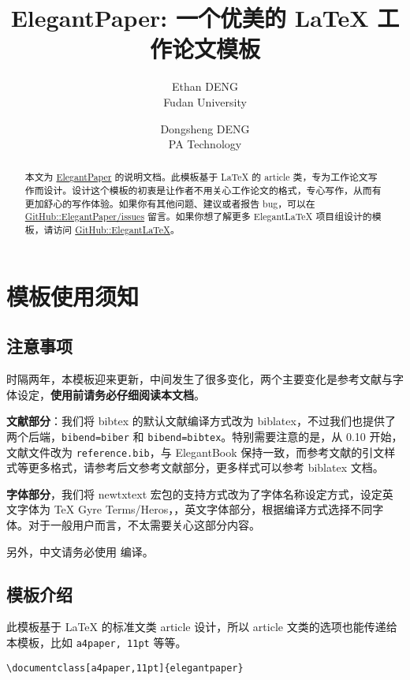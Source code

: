 \documentclass[lang=cn,11pt,a4paper]{elegantpaper}
\title{ElegantPaper: 一个优美的 \LaTeX{} 工作论文模板}
\author{Ethan DENG \\ Fudan University \and Dongsheng DENG \\ PA Technology}
\institute{\href{https://elegantlatex.org/}{Elegant\LaTeX{} 项目组}}
\date{\zhtoday}
\begin{document}
\maketitle

\begin{abstract}
本文为 \href{https://github.com/ElegantLaTeX/ElegantPaper/}{ElegantPaper} 的说明文档。此模板基于 \LaTeX{} 的 article 类，专为工作论文写作而设计。设计这个模板的初衷是让作者不用关心工作论文的格式，专心写作，从而有更加舒心的写作体验。如果你有其他问题、建议或者报告 bug，可以在 \href{https://github.com/ElegantLaTeX/ElegantPaper/issues}{GitHub::ElegantPaper/issues} 留言。如果你想了解更多 Elegant\LaTeX{} 项目组设计的模板，请访问 \href{https://github.com/ElegantLaTeX/}{GitHub::ElegantLaTeX}。
\end{abstract}


\section{模板使用须知}

\subsection{注意事项}

时隔两年，本模板迎来更新，中间发生了很多变化，两个主要变化是参考文献与字体设定，\textbf{使用前请务必仔细阅读本文档}。

\textbf{文献部分}：我们将 bibtex 的默认文献编译方式改为 biblatex，不过我们也提供了两个后端，\lstinline{bibend=biber} 和 \lstinline{bibend=bibtex}。特别需要注意的是，从 0.10 开始，文献文件改为 \lstinline{reference.bib}，与 ElegantBook 保持一致，而参考文献的引文样式等更多格式，请参考后文参考文献部分，更多样式可以参考 biblatex 文档。 

\textbf{字体部分}，我们将 newtxtext 宏包的支持方式改为了字体名称设定方式，设定英文字体为 TeX Gyre Terms/Heros，，英文字体部分，根据编译方式选择不同字体。对于一般用户而言，不太需要关心这部分内容。

另外，中文请务必使用  编译。

\subsection{模板介绍}

此模板基于 \LaTeX{} 的标准文类 article 设计，所以 article 文类的选项也能传递给本模板，比如 \lstinline{a4paper, 11pt} 等等。

\begin{lstlisting}
\documentclass[a4paper,11pt]{elegantpaper}
\end{lstlisting}
\end{document}
